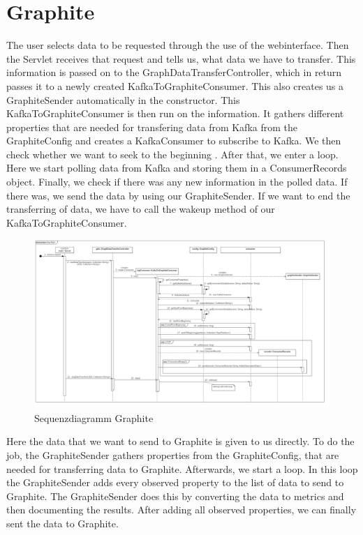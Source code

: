 \section{Graphite}
The user selects data to be requested through the use of the webinterface. Then the Servlet receives that request and tells us, what data we have to transfer. This information is passed on to the GraphDataTransferController, which in return passes it to a newly created KafkaToGraphiteConsumer. This also creates us a GraphiteSender automatically in the constructor. This KafkaToGraphiteConsumer is then run on the information. It gathers different properties that are needed for transfering data from Kafka from the GraphiteConfig and creates a KafkaConsumer to subscribe to Kafka. We then check whether we want to seek to the beginning . After that, we enter a loop. Here we start polling data from Kafka and storing them in a ConsumerRecords object. Finally, we check if there was any new information in the polled data. If there was, we send the data by using our GraphiteSender.
If we want to end the transferring of data, we have to call the wakeup method of our KafkaToGraphiteConsumer.
\begin{figure}[!hbp]
	\centering
	\includegraphics[width=\linewidth]{images/graphite/graphiteMainSequenceDiagram_small.png}
	\caption{Sequenzdiagramm Graphite}
\end{figure}
\newpage
Here the data that we want to send to Graphite is given to us directly. To do the job, the GraphiteSender gathers properties from the GraphiteConfig, that are needed for transferring data to Graphite. Afterwards, we start a loop. In this loop the GraphiteSender adds every observed property to the list of data to send to Graphite. The GraphiteSender does this by converting the data to metrics and then documenting the results. After adding all observed properties, we can finally sent the data to Graphite.
